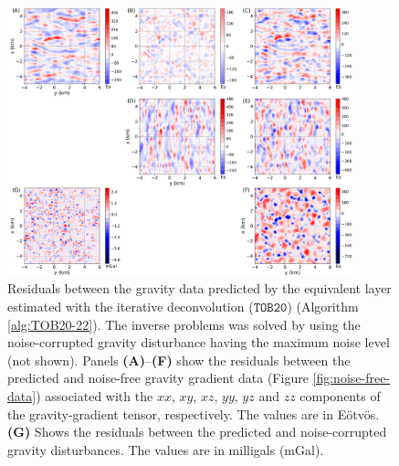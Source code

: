 \documentclass[utf8]{FrontiersinHarvard} %
\begin{document}
	\begin{figure}[htbp]
		\begin{center}
			\includegraphics[width=10cm]{Fig/TOB20_residuals}
		\end{center}
		\caption{
			Residuals between the gravity data predicted by the equivalent layer estimated with the 
			iterative deconvolution ($\mathtt{TOB20}$) (Algorithm \ref{alg:TOB20-22}).
			The inverse problems was solved by using the noise-corrupted gravity 
			disturbance having the maximum noise level (not shown).
			Panels \textbf{(A)}--\textbf{(F)} show the residuals between the predicted and noise-free
			gravity gradient data (Figure \ref{fig:noise-free-data}) associated with the
			$xx$, $xy$, $xz$, $yy$, $yz$ and $zz$ components of the gravity-gradient tensor, respectively. 
			The values are in Eötvös.
			\textbf{(G)} Shows the residuals between the predicted and noise-corrupted gravity disturbances.
			The values are in milligals (mGal).
		}
		\label{fig:residuals-TOB20}
	\end{figure}
	
\end{document}
